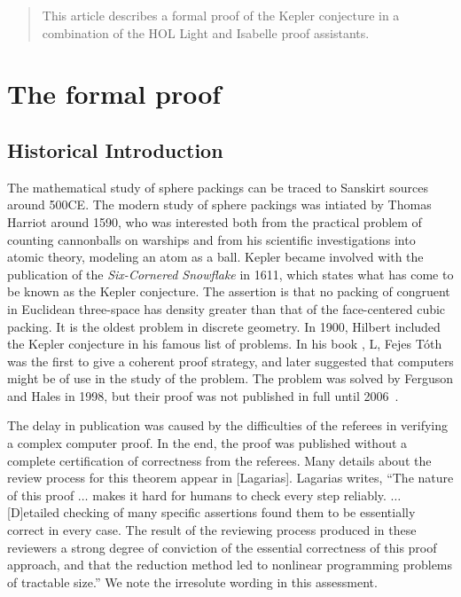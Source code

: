 \begin{abstract}
This article describes a formal proof of the Kepler conjecture in a combination of the HOL Light and Isabelle proof
assistants.
\end{abstract}

\chapter{The formal proof}\label{chap:hypermap}
%



\section{Historical Introduction}


The mathematical study of sphere packings can be traced to Sanskirt sources around 500CE.  The modern study
of sphere packings was intiated by Thomas Harriot around 1590, who was interested both from the practical problem
of counting cannonballs on warships and from his scientific investigations into atomic theory, modeling an atom
as a ball.  Kepler became involved with the publication of the {\it Six-Cornered Snowflake} in 1611, which states what has
come to be known as the Kepler conjecture.  The assertion is that no packing of congruent in Euclidean three-space has
density greater than that of the face-centered cubic packing.  It is the oldest problem in discrete geometry.
In 1900, Hilbert included the Kepler conjecture in his famous list of problems.  In his book \cite{XX},
L, Fejes T\'oth was the first
to give a coherent proof strategy, and later suggested that computers might be of use in the study of the problem.
The problem was solved by Ferguson and Hales in 1998, but their proof was not published in full until 2006~\cite{DCG}.

The delay in publication was caused by the difficulties of the referees in  verifying a complex computer proof.
In the end, the proof was published without a complete certification of correctness from the referees.  Many details about the
review process for this theorem appear in [Lagarias].  Lagarias writes, ``The nature of this proof $\ldots$ makes it hard for
humans to check every step reliably. $\ldots$  [D]etailed checking of many specific assertions found them
to be essentially correct in every case.  The result of the reviewing process produced in these reviewers a 
strong degree of conviction of the essential correctness of this proof approach, and that the reduction method
led to nonlinear programming problems of tractable size.''   We note the irresolute wording in this assessment.

